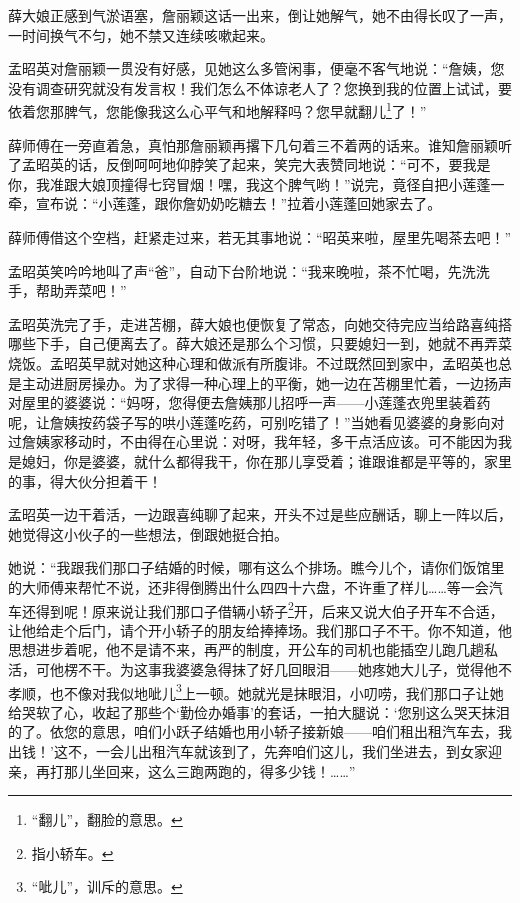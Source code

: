\par 薛大娘正感到气淤语塞，詹丽颖这话一出来，倒让她解气，她不由得长叹了一声，一时间换气不匀，她不禁又连续咳嗽起来。
\par 孟昭英对詹丽颖一贯没有好感，见她这么多管闲事，便毫不客气地说：“詹姨，您没有调查研究就没有发言权！我们怎么不体谅老人了？您换到我的位置上试试，要依着您那脾气，您能像我这么心平气和地解释吗？您早就翻儿\footnote{“翻儿”，翻脸的意思。}了！”
\par 薛师傅在一旁直着急，真怕那詹丽颖再撂下几句着三不着两的话来。谁知詹丽颖听了孟昭英的话，反倒呵呵地仰脖笑了起来，笑完大表赞同地说：“可不，要我是你，我准跟大娘顶撞得七窍冒烟！嘿，我这个脾气哟！”说完，竟径自把小莲蓬一牵，宣布说：“小莲蓬，跟你詹奶奶吃糖去！”拉着小莲蓬回她家去了。
\par 薛师傅借这个空档，赶紧走过来，若无其事地说：“昭英来啦，屋里先喝茶去吧！”
\par 孟昭英笑吟吟地叫了声“爸”，自动下台阶地说：“我来晚啦，茶不忙喝，先洗洗手，帮助弄菜吧！”
\par 孟昭英洗完了手，走进苫棚，薛大娘也便恢复了常态，向她交待完应当给路喜纯搭哪些下手，自己便离去了。薛大娘还是那么个习惯，只要媳妇一到，她就不再弄菜烧饭。孟昭英早就对她这种心理和做派有所腹诽。不过既然回到家中，孟昭英也总是主动进厨房操办。为了求得一种心理上的平衡，她一边在苫棚里忙着，一边扬声对屋里的婆婆说：“妈呀，您得便去詹姨那儿招呼一声——小莲蓬衣兜里装着药呢，让詹姨按药袋子写的哄小莲蓬吃药，可别吃错了！”当她看见婆婆的身影向对过詹姨家移动时，不由得在心里说：对呀，我年轻，多干点活应该。可不能因为我是媳妇，你是婆婆，就什么都得我干，你在那儿享受着；谁跟谁都是平等的，家里的事，得大伙分担着干！
\par 孟昭英一边干着活，一边跟喜纯聊了起来，开头不过是些应酬话，聊上一阵以后，她觉得这小伙子的一些想法，倒跟她挺合拍。
\par 她说：“我跟我们那口子结婚的时候，哪有这么个排场。瞧今儿个，请你们饭馆里的大师傅来帮忙不说，还非得倒腾出什么四四十六盘，不许重了样儿……等一会汽车还得到呢！原来说让我们那口子借辆小轿子\footnote{指小轿车。}开，后来又说大伯子开车不合适，让他给走个后门，请个开小轿子的朋友给捧捧场。我们那口子不干。你不知道，他思想进步着呢，他不是请不来，再严的制度，开公车的司机也能插空儿跑几趟私活，可他楞不干。为这事我婆婆急得抹了好几回眼泪——她疼她大儿子，觉得他不孝顺，也不像对我似地呲儿\footnote{“呲儿”，训斥的意思。}上一顿。她就光是抹眼泪，小叨唠，我们那口子让她给哭软了心，收起了那些个‘勤俭办婚事’的套话，一拍大腿说：‘您别这么哭天抹泪的了。依您的意思，咱们小跃子结婚也用小轿子接新娘——咱们租出租汽车去，我出钱！’这不，一会儿出租汽车就该到了，先奔咱们这儿，我们坐进去，到女家迎亲，再打那儿坐回来，这么三跑两跑的，得多少钱！……”
